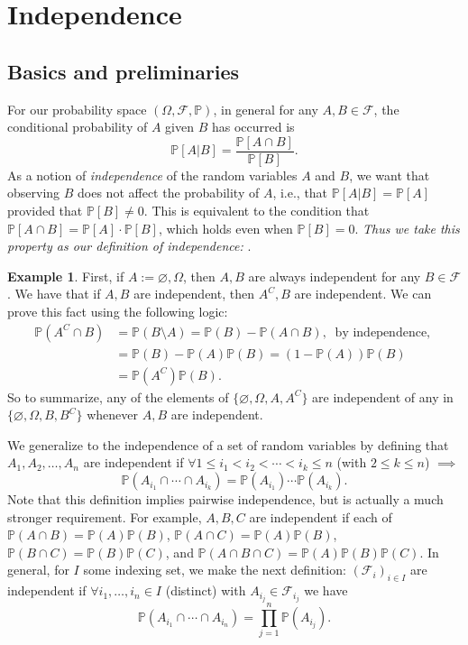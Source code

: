 \documentclass[12pt,reqno]{article}
\renewcommand{\emph}[1]{\textit{#1}}
\theoremstyle{plain}
\theoremstyle{definition}
\newtheorem{example}[theorem]{Example}
\newcommand{\PP}[1]{\ensuremath{\mathbb{P}\left(#1\right)}}
\begin{document}
\newpage 
\section{Independence} 

\subsection{Basics and preliminaries}

For our probability space $(\Omega, \mathcal{F}, \mathbb{P})$, in general for 
any $A,B \in \mathcal{F}$, the conditional probability of $A$ given $B$ has 
occurred is 
\[
\mathbb{P}[A|B] = \frac{\mathbb{P}[A \cap B]}{\mathbb{P}[B]}. 
\]
As a notion of \emph{independence} of the random variables $A$ and $B$, we want that 
observing $B$ does not affect the probability of $A$, i.e., that 
$\mathbb{P}[A|B] = \mathbb{P}[A]$ provided that $\mathbb{P}[B] \neq 0$. 
This is equivalent to the condition that $\mathbb{P}[A \cap B] = \mathbb{P}[A] \cdot \mathbb{P}[B]$, 
which holds even when $\mathbb{P}[B] = 0$. 
\emph{Thus we take this property as our definition of independence: } 
. 

\begin{example} 
First, if $A := \varnothing,\Omega$, then $A,B$ are always independent for any $B \in \mathcal{F}$. 
We have that if $A,B$ are independent, then $A^C,B$ are independent. We can prove this fact using the 
following logic:
\begin{align*} 
\mathbb{P}(A^C \cap B) & = \mathbb{P}(B \setminus A) = \mathbb{P}(B) - \mathbb{P}(A \cap B),\ 
     \text{ by independence, } \\ 
     & = \mathbb{P}(B) - \mathbb{P}(A) \mathbb{P}(B) = (1-\mathbb{P}(A)) \mathbb{P}(B) \\ 
     & = \mathbb{P}(A^C) \mathbb{P}(B). 
\end{align*} 
So to summarize, any of the elements of $\{\varnothing,\Omega,A,A^C\}$ are independent of any in 
$\{\varnothing,\Omega,B,B^C\}$ whenever $A,B$ are independent. 
\end{example} 
We generalize to the independence of a set of random variables by defining that 
$A_1,A_2,\ldots,A_n$ are independent if $\forall 1 \leq i_1 < i_2 < \cdots < i_k \leq n$ (with 
$2 \leq k \leq n$) $\implies$ 
\[
\mathbb{P}(A_{i_1} \cap \cdots \cap A_{i_k}) = \mathbb{P}(A_{i_1}) \cdots \mathbb{P}(A_{i_k}). 
\]
Note that this definition implies pairwise independence, but is actually a much stronger 
requirement. For example, $A,B,C$ are independent if each of 
$\PP{A \cap B} = \PP{A} \PP{B}$, $\PP{A \cap C} = \PP{A} \PP{B}$, 
$\PP{B \cap C} = \PP{B} \PP{C}$, and $\PP{A \cap B \cap C} = \PP{A} \PP{B} \PP{C}$. 
In general, for $I$ some indexing set, we make the next definition: 
$(\mathcal{F}_i)_{i \in I}$ are independent if $\forall i_1,\ldots,i_n \in I$ (distinct) with 
$A_{i_j} \in \mathcal{F}_{i_j}$ we have 
\[
\PP{A_{i_1} \cap \cdots \cap A_{i_n}} = \prod_{j=1}^n \PP{A_{i_j}}. 
\]
\end{document}
